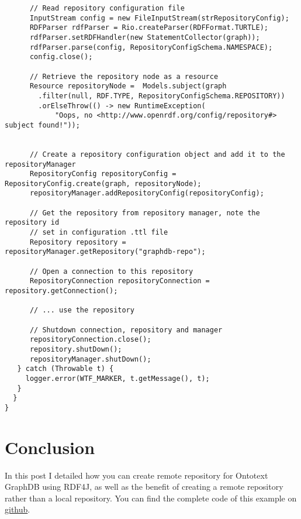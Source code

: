\documentclass{amsart}
\begin{document}
\begin{small}
\begin{verbatim}
      // Read repository configuration file
      InputStream config = new FileInputStream(strRepositoryConfig);
      RDFParser rdfParser = Rio.createParser(RDFFormat.TURTLE);
      rdfParser.setRDFHandler(new StatementCollector(graph));
      rdfParser.parse(config, RepositoryConfigSchema.NAMESPACE);
      config.close();

      // Retrieve the repository node as a resource
      Resource repositoryNode =  Models.subject(graph
        .filter(null, RDF.TYPE, RepositoryConfigSchema.REPOSITORY))
        .orElseThrow(() -> new RuntimeException(
            "Oops, no <http://www.openrdf.org/config/repository#> subject found!"));

		
      // Create a repository configuration object and add it to the repositoryManager		
      RepositoryConfig repositoryConfig = RepositoryConfig.create(graph, repositoryNode);
      repositoryManager.addRepositoryConfig(repositoryConfig);

      // Get the repository from repository manager, note the repository id 
      // set in configuration .ttl file
      Repository repository = repositoryManager.getRepository("graphdb-repo");

      // Open a connection to this repository
      RepositoryConnection repositoryConnection = repository.getConnection();

      // ... use the repository

      // Shutdown connection, repository and manager
      repositoryConnection.close();
      repository.shutDown();
      repositoryManager.shutDown();					
   } catch (Throwable t) {
     logger.error(WTF_MARKER, t.getMessage(), t);
   }		
  }
}    
   \end{verbatim}
  \end{small}

  
  \section{Conclusion}
  In this post I detailed how you can create remote repository for Ontotext GraphDB using RDF4J, as well as the benefit of creating a remote repository rather than a local repository. You can find the complete code of this example on \href{https://github.com/henrietteharmse/henrietteharmse/tree/master/blog/tutorial/graphdb/source/rdf4j}{github}.
  
  
  
 
\end{document}
